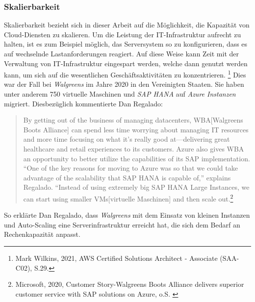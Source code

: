 \subsubsection{Skalierbarkeit}
Skalierbarkeit bezieht sich in dieser Arbeit auf die Möglichkeit, die Kapazität von Cloud-Diensten zu skalieren. Um die Leistung der IT-Infrastruktur aufrecht zu halten, ist es zum Beispiel möglich, das Serversystem so zu konfigurieren, dass es auf wechselnde Lastanforderungen reagiert.
%
Auf diese Weise kann Zeit mit der Verwaltung von IT-Infrastruktur eingespart werden, welche dann genutzt werden kann, um sich auf die wesentlichen Geschäftsaktivitäten zu konzentrieren.
\footnote{Mark Wilkins, 2021, AWS Certified Solutions Architect - Associate (SAA-C02), S.29.\cite{AWS1}}
Dies war der Fall bei \textit{Walgreens} im Jahre 2020 in den Vereinigten Staaten.
Sie haben unter anderem 750 virtuelle Maschinen und \textit{SAP HANA} auf \textit{Azure Instanzen} migriert.
Diesbezüglich kommentierte Dan Regalado:
\begin{quote}
      By getting out of the business of managing datacenters, WBA[Walgreens Boots Alliance] can spend less time worrying about managing IT resources and more time focusing on what it’s really good at—delivering great healthcare and retail experiences to its customers. Azure also gives WBA an opportunity to better utilize the capabilities of its SAP implementation. “One of the key reasons for moving to Azure was so that we could take advantage of the scalability that SAP HANA is capable of,” explains Regalado. “Instead of using extremely big SAP HANA Large Instances, we can start using smaller VMs[virtuelle Maschinen] and then scale out.\footnote{Microsoft, 2020, Customer Story-Walgreens Boots Alliance delivers superior customer service with SAP solutions on Azure, o.S. \cite{AZU01}}
\end{quote}
So erklärte Dan Regalado, dass \textit{Walgreens} mit dem Einsatz von kleinen Instanzen und Auto-Scaling eine Serverinfrastruktur erreicht hat, die sich dem Bedarf an Rechenkapazität anpasst. 

